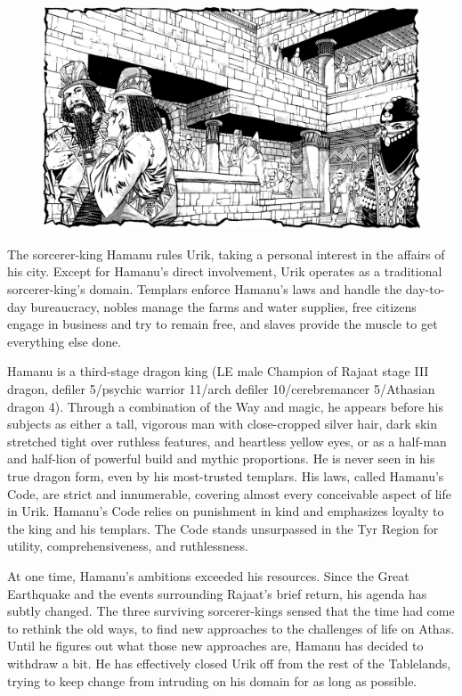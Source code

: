 {
\begin{figure}[b!]
\centering
\includegraphics[width=\textwidth]{images/urik-2.png}
\WOTC
\end{figure}

	The sorcerer-king Hamanu rules Urik, taking a personal interest in the affairs of his city. Except for Hamanu's direct involvement, Urik operates as a traditional sorcerer-king's domain. Templars enforce Hamanu's laws and handle the day-to-day bureaucracy, nobles manage the farms and water supplies, free citizens engage in business and try to remain free, and slaves provide the muscle to get everything else done.

	Hamanu is a third-stage dragon king (LE male Champion of Rajaat stage III dragon, defiler 5/psychic warrior 11/arch defiler 10/cerebremancer 5/Athasian dragon 4). Through a combination of the Way and magic, he appears before his subjects as either a tall, vigorous man with close-cropped silver hair, dark skin stretched tight over ruthless features, and heartless yellow eyes, or as a half-man and half-lion of powerful build and mythic proportions. He is never seen in his true dragon form, even by his most-trusted templars. His laws, called Hamanu's Code, are strict and innumerable, covering almost every conceivable aspect of life in Urik. Hamanu's Code relies on punishment in kind and emphasizes loyalty to the king and his templars. The Code stands unsurpassed in the Tyr Region for utility, comprehensiveness, and ruthlessness.

	At one time, Hamanu's ambitions exceeded his resources. Since the Great Earthquake and the events surrounding Rajaat's brief return, his agenda has subtly changed. The three surviving sorcerer-kings sensed that the time had come to rethink the old ways, to find new approaches to the challenges of life on Athas. Until he figures out what those new approaches are, Hamanu has decided to withdraw a bit. He has effectively closed Urik off from the rest of the Tablelands, trying to keep change from intruding on his domain for as long as possible.
}
